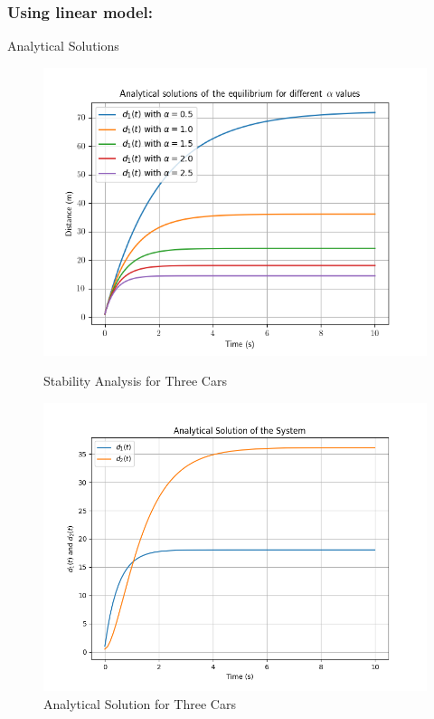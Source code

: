 \documentclass{beamer}
\begin{document}
\subsubsection{Using linear model:}
\begin{frame}{Analytical Solutions}
	\begin{figure}[H]
		\centering
		\begin{minipage}[t]{0.49\linewidth}
			\centering
			\includegraphics[width=\linewidth]{Stability.png}
			\caption{Stability Analysis for Three Cars}
			\label{fig:StabilityAnalysis}
		\end{minipage}
		\begin{minipage}[t]{0.49\linewidth}
			\centering
			\includegraphics[width=\linewidth]{AnalyticalSolution.png}
			\caption{Analytical Solution for Three Cars}
			\label{fig:AnalyticalSolution}
		\end{minipage}\hfill
		\label{fig:CombinedFigures}
	\end{figure}
\end{frame}
\end{document}
